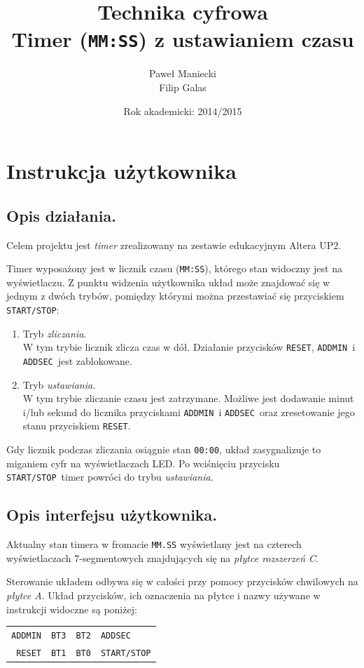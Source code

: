\documentclass[a4paper,oneside]{report}
\title{
	\textbf{Technika cyfrowa}
	\\
	Timer (\texttt{MM:SS}) z ustawianiem czasu
	}
\author{
	Paweł Maniecki\\
	Filip Galas
	}
\date{Rok akademicki: 2014/2015}
\newcommand{\startstop}{\texttt{START/STOP}}
\newcommand{\reset}{\texttt{RESET}}
\newcommand{\addmin}{\texttt{ADD\textunderscore MIN}}
\newcommand{\addsec}{\texttt{ADD\textunderscore SEC}}
\begin{document}
\maketitle

\tableofcontents
\listoffigures

\chapter{Instrukcja użytkownika}
\section{Opis działania.}
Celem projektu jest \emph{timer} zrealizowany na zestawie
edukacyjnym Altera UP2.

Timer wyposażony jest w licznik czasu (\texttt{MM:SS}), którego
stan widoczny jest na wyświetlaczu. Z punktu widzenia użytkownika
układ może znajdować się w jednym z dwóch trybów, pomiędzy którymi
można przestawiać się przyciskiem \startstop :
\begin{enumerate}
\item Tryb \emph{zliczania}.\\
W tym trybie licznik zlicza czas w dół. Działanie przycisków
\reset , \addmin\ i \addsec\ jest zablokowane.
\item Tryb \emph{ustawiania}.\\
W tym trybie zliczanie czasu jest zatrzymane. Możliwe jest
dodawanie minut i/lub sekund do licznika przyciskami \addmin\ i
\addsec\ oraz zresetowanie jego stanu przyciskiem \reset .
\end{enumerate}
Gdy licznik podczas zliczania osiągnie stan \texttt{00:00}, układ
zasygnalizuje to miganiem cyfr na wyświetlaczach LED. Po
wciśnięciu przycisku \startstop\ timer powróci do trybu
\emph{ustawiania}.

\pagebreak
\section{Opis interfejsu użytkownika.}
Aktualny stan timera w fromacie \texttt{MM.SS} wyświetlany jest na czterech wyświetlaczach 
7-segmentowych znajdujących się na \emph{płytce rozszerzeń C}. 

Sterowanie układem odbywa się w całości przy pomocy przycisków chwilowych na \emph{płytce A}. 
Układ przycisków, ich oznaczenia na płytce i nazwy używane w instrukcji widoczne są poniżej:
\begin{table}[h] \centering
  \renewcommand{\arraystretch}{2}
  \begin{tabular}{r|c|c|l} \cline{2-3}
  \addmin & \texttt{BT3} & \texttt{BT2} & \addsec    \\ \cline{2-3}
  \reset  & \texttt{BT1} & \texttt{BT0} & \startstop \\ \cline{2-3}
  \end{tabular}
\end{table}
\end{document}
